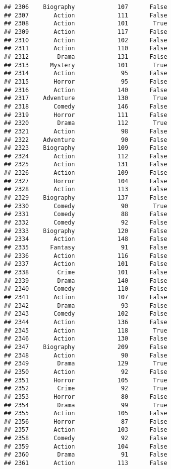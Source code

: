 \documentclass[
]{article}
\begin{document}
\begin{verbatim}
## 2306    Biography            107      False
## 2307       Action            111      False
## 2308       Action            101       True
## 2309       Action            117      False
## 2310       Action            102      False
## 2311       Action            110      False
## 2312        Drama            131      False
## 2313      Mystery            101       True
## 2314       Action             95      False
## 2315       Horror             95      False
## 2316       Action            140      False
## 2317    Adventure            130       True
## 2318       Comedy            146      False
## 2319       Horror            111      False
## 2320        Drama            112       True
## 2321       Action             98      False
## 2322    Adventure             90      False
## 2323    Biography            109      False
## 2324       Action            112      False
## 2325       Action            131      False
## 2326       Action            109      False
## 2327       Horror            104      False
## 2328       Action            113      False
## 2329    Biography            137      False
## 2330       Comedy             90       True
## 2331       Comedy             88      False
## 2332       Comedy             92      False
## 2333    Biography            120      False
## 2334       Action            148      False
## 2335      Fantasy             91      False
## 2336       Action            116      False
## 2337       Action            101      False
## 2338        Crime            101      False
## 2339        Drama            140      False
## 2340       Comedy            110      False
## 2341       Action            107      False
## 2342        Drama             93      False
## 2343       Comedy            102      False
## 2344       Action            136      False
## 2345       Action            118       True
## 2346       Action            130      False
## 2347    Biography            209      False
## 2348       Action             90      False
## 2349        Drama            129       True
## 2350       Action             92      False
## 2351       Horror            105       True
## 2352        Crime             92       True
## 2353       Horror             80      False
## 2354        Drama             99       True
## 2355       Action            105      False
## 2356       Horror             87      False
## 2357       Action            103      False
## 2358       Comedy             92      False
## 2359       Action            104      False
## 2360        Drama             91      False
## 2361       Action            113      False

\end{verbatim}
\end{document}
